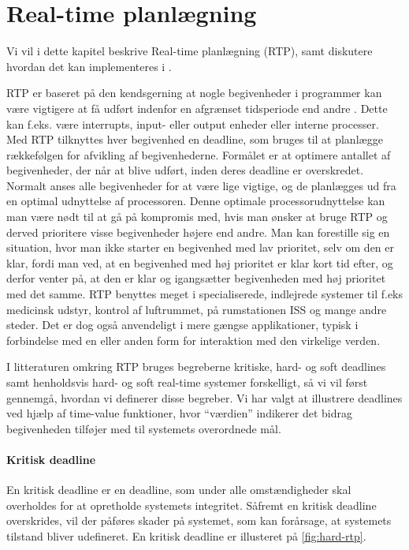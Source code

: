\chapter{Real-time planlægning}
\label{chap:rtp}
Vi vil i dette kapitel beskrive Real-time planlægning (RTP), samt diskutere hvordan det kan implementeres i \pycsp. 

RTP er baseret på den kendsgerning at nogle begivenheder i programmer kan være vigtigere at få udført indenfor en afgrænset tidsperiode end andre . Dette kan f.eks. være interrupts, input- eller output enheder eller interne processer. Med RTP tilknyttes hver begivenhed en deadline, som bruges til at planlægge rækkefølgen for afvikling af begivenhederne. Formålet er at optimere antallet af begivenheder, der når at blive udført, inden deres deadline er overskredet. Normalt anses alle begivenheder for at være lige vigtige, og de planlægges ud fra en optimal udnyttelse af processoren. Denne optimale processorudnyttelse kan man være nødt til at gå på kompromis med, hvis man ønsker at bruge RTP og derved prioritere visse begivenheder højere end andre. Man kan forestille sig en situation, hvor man ikke starter en begivenhed med lav prioritet, selv om den er klar, fordi man ved, at en begivenhed med høj prioritet er klar kort tid efter, og derfor venter på, at den er klar og igangsætter begivenheden med høj prioritet med det samme. 
RTP benyttes meget i specialiserede, indlejrede systemer til f.eks medicinsk udstyr, kontrol af luftrummet, på rumstationen ISS\cite{Audsley1990} og mange andre steder. Det er dog også anvendeligt i mere gængse applikationer, typisk i forbindelse med en eller anden form for interaktion med den virkelige verden. 

I litteraturen omkring RTP bruges begreberne kritiske, hard- og soft deadlines samt henholdsvis hard- og soft real-time systemer forskelligt, så vi vil først gennemgå, hvordan vi definerer disse begreber. Vi har valgt at illustrere deadlines ved hjælp af time-value funktioner, hvor ``værdien'' indikerer det bidrag begivenheden tilføjer med til systemets overordnede mål. 

\subsubsection{Kritisk deadline}
En kritisk deadline er en deadline, som under alle omstændigheder skal overholdes for at opretholde systemets integritet. Såfremt en kritisk deadline overskrides, vil der påføres skader på systemet, som kan forårsage, at systemets tilstand bliver udefineret. En kritisk deadline er illusteret på \cref{fig:hard-rtp}.

